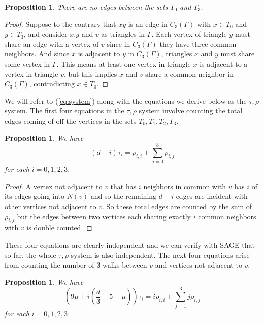 \documentclass[12pt]{report}
\newtheorem{prop}[thm]{Proposition}
\theoremstyle{definition}
\begin{document}
\begin{prop}
    There are no edges between the sets $T_0$ and $T_3$.
\end{prop}
\begin{proof}
    Suppose to the contrary that $xy$ is an edge in $C_3(\Gamma)$ with $x\in T_0$ and $y\in T_3$, and consider $x$,$y$ and $v$ as triangles in $\Gamma$. Each vertex of triangle $y$ must share an edge with a vertex of $v$ since in $C_3(\Gamma)$ they have three common neighbors. And since $x$ is adjacent to $y$ in $C_3(\Gamma)$, triangles $x$ and $y$ must share some vertex in $\Gamma$. This means at least one vertex in triangle $x$ is adjacent to a vertex in triangle $v$, but this implies $x$ and $v$ share a common neighbor in $C_3(\Gamma)$, contradicting $x\in T_0$.
\end{proof}
We will refer to (\ref{eq:system}) along with the equations we derive below as the $\tau, \rho$ system. The first four equations in the $\tau, \rho$ system involve counting the total edges coming of off the vertices in the sets $T_0,T_1,T_2,T_3$. 
\begin{prop}\label{edgecount}
    We have
    \[(d-i)\tau_i=\rho_{i,i}+\sum_{j=0}^3\rho_{i,j}\]
    for each $i=0,1,2,3$.
\end{prop}
\begin{proof}
    A vertex not adjacent to $v$ that has $i$ neighbors in common with $v$ has $i$ of its edges going into $N(v)$ and so the remaining $d-i$ edges are incident with other vertices not adjacent to $v$. So these total edges are counted by the sum of $\rho_{i,j}$ but the edges between two vertices each sharing exactly $i$ common neighbors with $v$ is double counted.
\end{proof}
These four equations are clearly independent and we can verify with SAGE that so far, the whole $\tau,\rho$ system is also independent. The next four equations arise from counting the number of 3-walks between $v$ and vertices not adjacent to $v$.
\begin{prop}\label{prop:3walk}
    We have
    \[\left ( 9\mu +i\left(\frac{d}{3}-5 -\mu\right) \right)\tau_i=i\rho_{i,i}+\sum_{j=1}^3j\rho_{i,j}\]
    for each $i=0,1,2,3$.
\end{prop}
\end{document}
